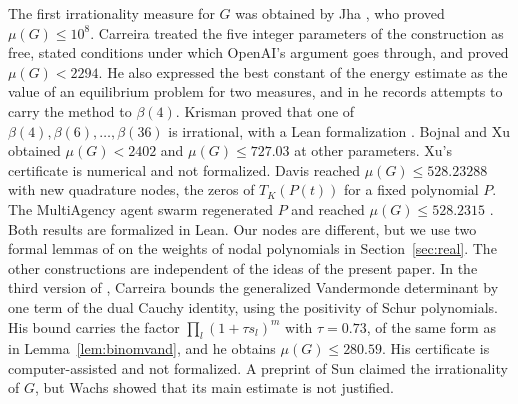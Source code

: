 \documentclass[11pt]{amsart}
\theoremstyle{definition}
\theoremstyle{remark}
\numberwithin{equation}{section}
\begin{document}
The first irrationality measure for $G$ was obtained by Jha \cite{Jha2026}, who proved $\mu(G)\le10^8$.
Carreira \cite{Carreira2026} treated the five integer parameters of the construction as free, stated
conditions under which OpenAI's argument goes through, and proved $\mu(G)<2294$. He also expressed the best
constant of the energy estimate as the value of an equilibrium problem for two measures, and in
\cite{Carreira2026b} he records attempts to carry the method to $\beta(4)$. Krisman proved that one of
$\beta(4),\beta(6),\ldots,\beta(36)$ is irrational, with a Lean formalization \cite{Krisman26}. Bojnal \cite{Bojnal2026} and Xu
\cite{Xu2026} obtained $\mu(G)<2402$ and $\mu(G)\le727.03$ at other parameters. Xu's certificate is
numerical and not formalized. Davis \cite{Davis2026} reached $\mu(G)\le528.23288$ with new quadrature nodes, the zeros of $T_K(P(t))$
for a fixed polynomial $P$. The MultiAgency agent swarm regenerated $P$ and reached $\mu(G)\le528.2315$
\cite{MultiAgency2026}. Both results are formalized in Lean. Our nodes are different, but we use two
formal lemmas of \cite{Davis2026} on the weights of nodal polynomials in Section~\ref{sec:real}. The
other constructions are independent of the ideas of the present paper.
In the third version of \cite{Carreira2026}, Carreira bounds the generalized Vandermonde determinant
by one term of the dual Cauchy identity, using the positivity of Schur polynomials. His bound
carries the factor $\prod_l(1+\tau s_l)^m$ with $\tau=0.73$, of the same form as in
Lemma~\ref{lem:binomvand}, and he obtains $\mu(G)\le280.59$. His certificate is computer-assisted and not formalized.
A preprint of Sun \cite{Sun2026} claimed the irrationality of $G$, but Wachs
\cite{Wachs2026} showed that its main estimate is not justified.
\end{document}
